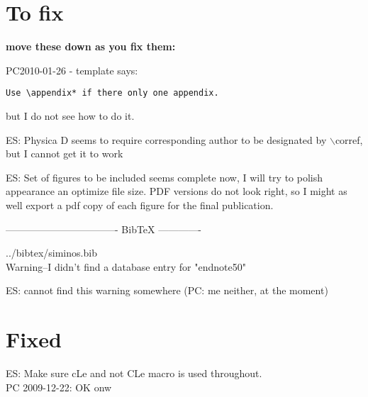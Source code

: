 
\section{To fix}

{\bf move these down as you fix them:}

PC2010-01-26 - template says:
\begin{verbatim}
Use \appendix* if there only one appendix.
\end{verbatim}
but I do not see how to do it.

ES: Physica D seems to require corresponding author to be
designated by $\backslash$corref, but I cannot get it to work

ES: Set of figures to be included seems complete now, I will
try to polish appearance an optimize file size. PDF versions
do not look right, so I might as well export a pdf copy of
each figure for the final publication.


---------------------------------- BibTeX -------------

../bibtex/siminos.bib
\\
Warning--I didn't find a database entry for "endnote50"

ES: cannot find this warning somewhere
(PC: me neither, at the moment)

\section*{Fixed}

ES: Make sure cLe and not CLe macro is used throughout.
\\
PC 2009-12-22: OK onw
